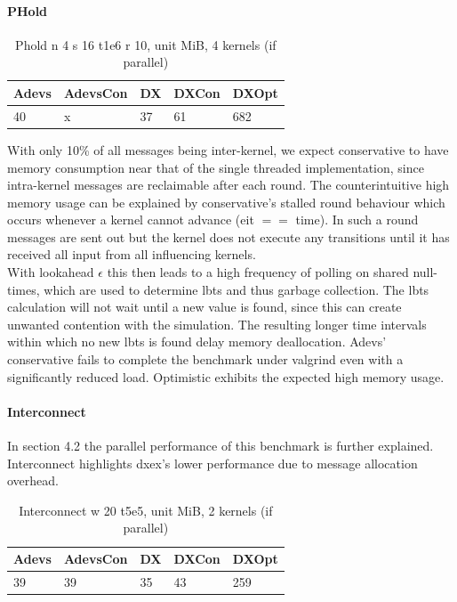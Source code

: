 \paragraph*{PHold}
\begin{table}[htb]
	\centering
	\caption{Phold n 4 s 16 t1e6 r 10, unit MiB, 4 kernels (if parallel)}
	\label{dtone_mem}
	\begin{tabular}{| l | l | l | l | l |}
		\hline
		Adevs & AdevsCon &DX &DXCon &DXOpt\\ \hline
		40 & x & 37 & 61 & 682  \\ \hline
	\end{tabular}
\end{table}
With only 10\% of all messages being inter-kernel, we expect conservative to have memory consumption near that of the single threaded implementation, since intra-kernel messages are reclaimable after each round. The counterintuitive high memory usage can be explained by conservative's stalled round behaviour which occurs whenever a kernel cannot advance (eit $==$ time). In such a round messages are sent out but the kernel does not execute any transitions until it has received all input from all influencing kernels. \\
With lookahead $\epsilon$ this then leads to a high frequency of polling on shared null-times, which are used to determine lbts and thus garbage collection.
The lbts calculation will not wait until a new value is found, since this can create unwanted contention with the simulation. The resulting longer time intervals within which no new lbts is found delay memory deallocation.
Adevs' conservative fails to complete the benchmark under valgrind even with a significantly reduced load.
Optimistic exhibits the expected high memory usage.
\paragraph*{Interconnect}
In section 4.2 the parallel performance of this benchmark is further explained. Interconnect highlights dxex's lower performance due to message allocation overhead. 
\begin{table}[lhtb]
	\centering
	\caption{Interconnect w 20 t5e5, unit MiB, 2 kernels (if parallel)}
	\label{iconn_mem}
	\begin{tabular}{| l | l | l | l | l |}
		\hline
		Adevs & AdevsCon &DX &DXCon & DXOpt\\ \hline
		39 & 39 & 35 & 43 & 259 \\ \hline
	\end{tabular}
\end{table}
		
